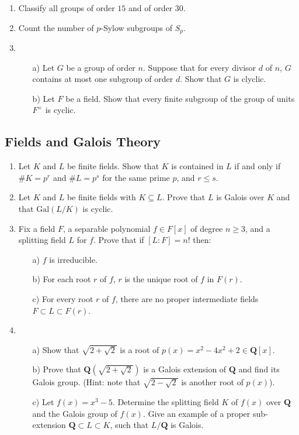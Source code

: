 \documentclass[11pt]{amsart}
\theoremstyle{plain}
\theoremstyle{definition}
\theoremstyle{remark}
\begin{document}
\begin{enumerate}
    \item Classify all groups of order $15$ and of order $30$.
        
    \item Count the number of $p$-Sylow subgroups of $S_p$.
    
    \item \begin{enumerate}
        \item[a)] Let $G$ be a group of order $n$. Suppose that for every divisor $d$ of $n$, $G$ contains at most one subgroup of order $d$. Show that $G$ is clyclic.
        \item[b)] Let $F$ be a field. Show that every finite subgroup of the group of units $F^\times$ is cyclic.
    \end{enumerate}
    \end{enumerate}
\subsection{Fields and Galois Theory}

    \begin{enumerate}
        \item Let $K$ and $L$ be finite fields. Show that $K$ is contained in $L$ if and only if $\# K = p^r$ and $\# L = p^s$ for the same prime $p$, and $r \leq s$.
        
        \item Let $K$ and $L$ be finite fields with $K \subseteq L$. Prove that $L$ is Galois over $K$ and that $\mathrm{Gal}(L/K)$ is cyclic.
        
        \item Fix a field $F$, a separable polynomial $f\in F[x]$ of degree $n \geq 3$, and a splitting field $L$ for $f$. Prove that if $[L:F] = n!$ then:
    \begin{enumerate}
        \item[a)] $f$ is irreducible.
        \item[b)] For each root $r$ of $f$, $r$ is the unique root of $f$ in $F(r)$.
        \item[c)] For every root $r$ of $f$, there are no proper intermediate fields $F \subset L \subset F(r)$.
    \end{enumerate}
    
    \item \begin{enumerate}
        \item[a)] Show that $\sqrt{2+\sqrt{2}}$ is a root of $p(x) = x^2 - 4x^2 + 2 \in \mathbf{Q}[x]$.
        \item[b)] Prove that $\mathbf{Q}(\sqrt{2 + \sqrt{2}})$ is a Galois extension of $\mathbf{Q}$ and find its Galois group. (Hint: note that $\sqrt{2 - \sqrt{2}}$ is another root of $p(x)$).
        \item[c)] Let $f(x) = x^3 - 5$. Determine the splitting field $K$ of $f(x)$ over $\mathbf{Q}$ and the Galois group of $f(x)$. Give an example of a proper sub-extension $\mathbf{Q} \subset L \subset K$, such that $L/\mathbf{Q}$ is Galois.
    \end{enumerate}
    \end{enumerate}
\end{document}
